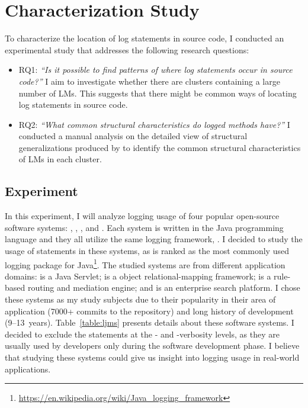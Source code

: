 \chapter{Characterization Study}\label{discover}\label{eval}

To characterize the location of log statements in source code, I conducted an experimental study that addresses the following research questions:

\begin{itemize} [leftmargin=.5in]
\item \textsc{RQ1: }\emph{``Is it possible to find patterns of where log statements occur in source code?''} I aim to investigate whether there are clusters containing a large number of LMs. This suggests that there might be common ways of locating log statements in source code.

\item \textsc{RQ2: }\emph{``What common structural characteristics do logged methods have?''} I conducted a manual analysis on the detailed view of structural generalizations produced by  to identify the common structural characteristics of LMs in each cluster.
\end{itemize}


\section{Experiment}  \label{setup-characterization}
In this experiment, I will analyze logging usage of four popular open-source software systems: , , , and . Each system is written in the Java programming language and they all utilize the same logging framework, . I decided to study the usage of  statements in these systems, as  is ranked as the most commonly used logging package for Java\footnote{\url{https://en.wikipedia.org/wiki/Java_logging_framework}}. The studied systems are from different application domains:  is a Java Servlet;  is a object relational-mapping framework;  is a rule-based routing and mediation engine; and  is an enterprise search platform. I chose these systems as my study subjects due to their popularity in their area of application (7000+ commits to the  repository) and long history of development (9--13~years). Table~\ref{table:ljms} presents details about these software systems. I decided to exclude the  statements at the - and -verbosity levels, as they are usually used by developers only during the software development phase. I believe that studying these systems could give us insight into logging usage in real-world applications.


